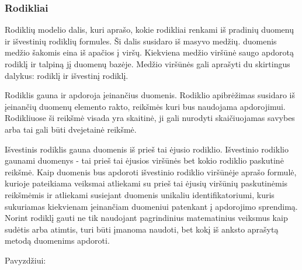 \documentclass{VUMIFPSbakalaurinis}
\begin{document}
\subsubsection{Rodikliai}
Rodiklių modelio dalis, kuri aprašo, kokie rodikliai renkami iš pradinių duomenų ir išvestinių rodiklių formules. 
Ši dalis susidaro iš masyvo medžių. duomenis medžio šakomis eina iš apačios į viršų. Kiekviena medžio viršūnė saugo apdorotą rodiklį ir talpiną jį duomenų bazėje. Medžio viršūnės gali aprašyti du skirtingus dalykus: rodiklį ir išvestinį rodiklį. \par
Rodiklis gauna ir apdoroja įeinančius duomenis. Rodiklio apibrėžimas susidaro iš įeinančių duomenų elemento rakto, reikšmės kuri bus naudojama apdorojimui. Rodikliuose ši reikšmė visada yra skaitinė, ji gali nurodyti skaičiuojamas savybes arba tai gali būti dvejetainė reikšmė. \par
Išvestinis rodiklis gauna duomenis iš prieš tai ėjusio rodiklio. Išvestinio rodiklio gaunami duomenys - tai prieš tai ėjusios viršūnės bet kokio rodiklio paskutinė reikšmė. Kaip duomenis bus apdoroti išvestinio rodiklio viršūnėje aprašo formulė, kurioje pateikiama veiksmai atliekami su prieš tai ėjusių viršūnių paskutinėmis reikšmėmis ir atliekami susiejant duomenis unikaliu identifikatoriumi, kuris sukuriamas kiekvienam įeinančiam duomeniui patenkant į apdorojimo sprendimą. Norint rodiklį gauti ne tik naudojant pagrindinius matematinius veiksmus kaip sudėtis arba atimtis, turi būti įmanoma naudoti, bet kokį iš anksto aprašytą metodą duomenims apdoroti. \par
Pavyzdžiui:
\end{document}
